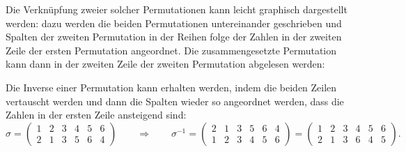 Die Verknüpfung zweier solcher Permutationen kann leicht graphisch
dargestellt werden: dazu werden die beiden Permutationen
untereinander geschrieben und Spalten der zweiten Permutation
in der Reihen folge der Zahlen in der zweiten Zeile der ersten
Permutation angeordnet.
Die zusammengesetzte Permutation kann dann in der zweiten Zeile
der zweiten Permutation abgelesen werden:
\begin{center}
\end{center}
Die Inverse einer Permutation kann erhalten werden, indem die beiden
Zeilen vertauscht werden und dann die Spalten wieder so angeordnet werden,
dass die Zahlen in der ersten Zeile ansteigend sind:
\[
\sigma = \begin{pmatrix}
1&2&3&4&5&6\\
2&1&3&5&6&4
\end{pmatrix}
\qquad\Rightarrow\qquad
\sigma^{-1}
=
\begin{pmatrix}
2&1&3&5&6&4\\
1&2&3&4&5&6
\end{pmatrix}
=
\begin{pmatrix}
1&2&3&4&5&6\\
2&1&3&6&4&5
\end{pmatrix}.
\]

